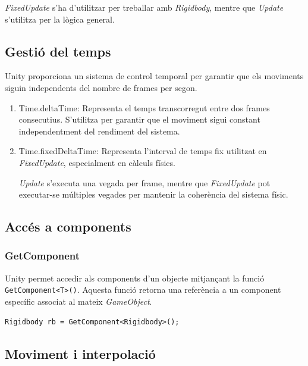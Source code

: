 \documentclass[12pt,a4paper]{report}
\begin{document}
\textit{FixedUpdate} s'ha d'utilitzar per treballar amb \textit{Rigidbody}, mentre que \textit{Update} s'utilitza per la lògica general. \cite{UnityUpdate}


\subsection{Gestió del temps}

Unity proporciona un sistema de control temporal \cite{UnityTime} per garantir que els moviments siguin independents del nombre de frames per segon.

\begin{enumerate}
    \item Time.deltaTime: Representa el temps transcorregut entre dos frames consecutius. S'utilitza per garantir que el moviment sigui constant independentment del rendiment del sistema.
    \item Time.fixedDeltaTime: Representa l'interval de temps fix utilitzat en \textit{FixedUpdate}, especialment en càlculs físics.

\textit{Update} s'executa una vegada per frame, mentre que \textit{FixedUpdate} pot executar-se múltiples vegades per mantenir la coherència del sistema físic. \cite{UnityUpdate}

\end{enumerate}

\subsection{Accés a components}

\subsubsection{GetComponent}

Unity permet accedir als components \cite{UnityComponents} d'un objecte mitjançant la funció \texttt{GetComponent<T>()}. Aquesta funció retorna una referència a un component específic associat al mateix \textit{GameObject}.

\begin{lstlisting}[language=CSharp]
Rigidbody rb = GetComponent<Rigidbody>();
\end{lstlisting}


\subsection{Moviment i interpolació}
\end{document}
